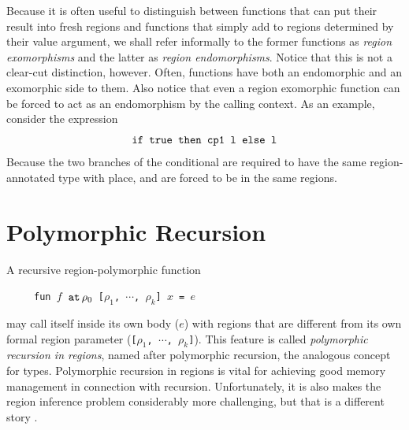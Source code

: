 \documentclass[12pt]{book}
\begin{document}
Because it is often useful to distinguish between functions that can
put their result into fresh regions and functions that simply add to
regions determined by their value argument, we shall refer informally
to the former functions as 
%
{\em region exomorphisms} and the latter as
%
{\em region endomorphisms}. Notice that this is not a clear-cut
distinction, however. Often, functions have both an endomorphic and an
exomorphic side to them. Also notice that even a region exomorphic
function can be forced to act as an endomorphism by the calling
context. As an example, consider the expression
$$\hbox{\tt if true then cp1 l else l}$$
Because the two branches of the conditional are required to have the same region-annotated
type with place,  and  are forced to be in the same regions.
%
\section{Polymorphic Recursion}
%
\label{polyrec.sec}
A recursive region-polymorphic function
\begin{tabbing}
\ \ \ \ \ \=\tt fun $f$ $\mathbin{\hbox{\tt at}}\,\rho_0$ [$\rho_1$, $\cdots$, $\rho_k$] $x$ = $e$
\end{tabbing}
may call itself inside its own body ($e$) with regions that are different
from its own formal region parameter ({\tt [$\rho_1$, $\cdots$, $\rho_k$]}).
This feature is called {\it polymorphic recursion in regions}, named after
polymorphic recursion, the analogous concept for types.
Polymorphic recursion in regions is vital for achieving good 
memory management in connection with recursion.
Unfortunately, it is also makes  the region inference problem considerably more
challenging, but that is a different story \cite{tofte:birkedal:98}.
\end{document}

